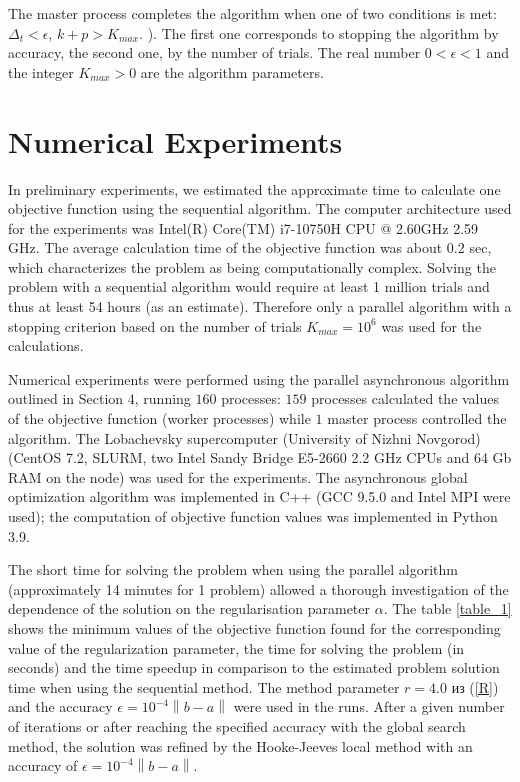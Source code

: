 \documentclass{svproc}
\begin{document}
The master process completes the algorithm when one of two conditions is met: $\Delta_{t}<\epsilon$, $k+p>K_{max}$.
). The first one corresponds to stopping the algorithm by accuracy, the second one, by the number of trials. The real number $0<\epsilon<1$ and the integer $K_{max}>0$ are the algorithm parameters.

\section{Numerical Experiments}\label{Sec_Exp}

In preliminary experiments, we estimated the approximate time to calculate one objective function using the sequential algorithm. The computer architecture used for the experiments was Intel(R) Core(TM) i7-10750H CPU @ 2.60GHz 2.59 GHz. The average calculation time of the objective function was about $0.2$ sec, which characterizes the problem as being computationally complex.  Solving the problem with a sequential algorithm would require at least 1 million trials and thus at least 54 hours (as an estimate). Therefore only a parallel algorithm with a stopping criterion based on the number of trials $K_{max}=10^6$ was used for the calculations. 

Numerical experiments were performed using the parallel asynchronous algorithm outlined in Section 4, running $160$ processes: $159$ processes calculated the values of the objective function (worker processes) while $1$ master process controlled the algorithm. The Lobachevsky  supercomputer (University of Nizhni Novgorod)  (CentOS 7.2, SLURM, two Intel Sandy Bridge E5-2660 2.2 GHz CPUs and 64 Gb RAM on the node) was used for the experiments. The asynchronous global optimization algorithm was implemented in C++ (GCC 9.5.0 and Intel MPI were used); the computation of objective function values was implemented in Python 3.9.

The short time for solving the problem when using the parallel algorithm (approximately 14 minutes for 1 problem) allowed a thorough investigation of the dependence of the solution on the regularisation parameter $\alpha$. The table \ref{table_1} shows the minimum values of the objective function found for the corresponding value of the regularization parameter, the time for solving the problem (in seconds) and the time speedup in comparison to the estimated problem solution time when using the sequential method. The method parameter $r=4.0$ из (\ref{R}) and the accuracy $\epsilon = 10^{-4}\left\|b-a\right\|$ were used in the runs. After a given number of iterations or after reaching the specified accuracy with the global search method, the solution was refined by the Hooke-Jeeves local method \cite{HookJeeves} with an accuracy of $\epsilon = 10^{-4}\left\|b-a\right\|$.
\end{document}
